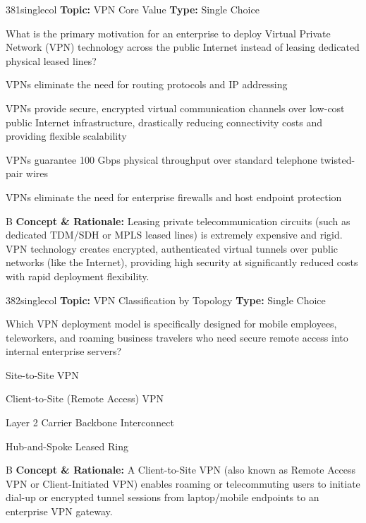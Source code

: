 \begin{qcard}{381}{singlecol}
\textcolor{darkslate!75}{\small\textbf{Topic:} VPN Core Value \hfill \textbf{Type:} Single Choice}\vspace{0.4em}\par
What is the primary motivation for an enterprise to deploy Virtual Private Network (VPN) technology across the public Internet instead of leasing dedicated physical leased lines?
\begin{qoptions}
\item VPNs eliminate the need for routing protocols and IP addressing
\item VPNs provide secure, encrypted virtual communication channels over low-cost public Internet infrastructure, drastically reducing connectivity costs and providing flexible scalability
\item VPNs guarantee 100 Gbps physical throughput over standard telephone twisted-pair wires
\item VPNs eliminate the need for enterprise firewalls and host endpoint protection
\end{qoptions}
\end{qcard}
\nopagebreak
\begin{explainbox}{B}
\textbf{Concept \& Rationale:} Leasing private telecommunication circuits (such as dedicated TDM/SDH or MPLS leased lines) is extremely expensive and rigid. VPN technology creates encrypted, authenticated virtual tunnels over public networks (like the Internet), providing high security at significantly reduced costs with rapid deployment flexibility.
\end{explainbox}

\begin{qcard}{382}{singlecol}
\textcolor{darkslate!75}{\small\textbf{Topic:} VPN Classification by Topology \hfill \textbf{Type:} Single Choice}\vspace{0.4em}\par
Which VPN deployment model is specifically designed for mobile employees, teleworkers, and roaming business travelers who need secure remote access into internal enterprise servers?
\begin{qoptions}
\item Site-to-Site VPN
\item Client-to-Site (Remote Access) VPN
\item Layer 2 Carrier Backbone Interconnect
\item Hub-and-Spoke Leased Ring
\end{qoptions}
\end{qcard}
\nopagebreak
\begin{explainbox}{B}
\textbf{Concept \& Rationale:} A Client-to-Site VPN (also known as Remote Access VPN or Client-Initiated VPN) enables roaming or telecommuting users to initiate dial-up or encrypted tunnel sessions from laptop/mobile endpoints to an enterprise VPN gateway.
\end{explainbox}

